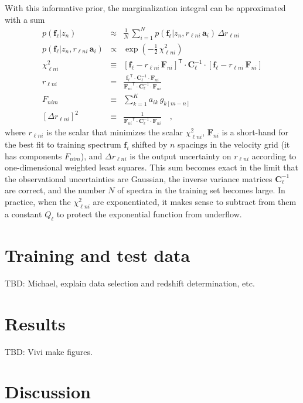 \documentclass[apj]{emulateapj}
\newcommand{\mmatrix}[1]{\boldsymbol{#1}}
\newcommand{\inverse}[1]{{#1}^{-1}}
\newcommand{\transpose}[1]{{#1}^{\mathsf{T}}}
\newcommand{\covar}{\mmatrix{C}}
\newcommand{\avec}{\mmatrix{a}}
\newcommand{\fvec}{\mmatrix{f}}
\newcommand{\Fvec}{\mmatrix{F}}
\newcommand{\invvar}{\inverse{\covar}}
\begin{document}
With this informative prior, the marginalization integral can be
approximated with a sum
\begin{eqnarray}\displaystyle
p(\fvec_\ell|z_n) &\approx& \frac{1}{N}\,\sum_{i=1}^N p(\fvec_\ell|z_n,r_{\ell ni}\,\avec_i)\,\Delta r_{\ell ni} \nonumber\\
p(\fvec_\ell|z_n,r_{\ell ni}\,\avec_i) &\propto& \exp(-\frac{1}{2}\,\chi^2_{\ell ni}) \nonumber\\
\chi^2_{\ell ni} &\equiv& \transpose{[\fvec_\ell - r_{\ell ni}\,\Fvec_{ni}]}\cdot\invvar_\ell\cdot[\fvec_\ell - r_{\ell ni}\,\Fvec_{ni}] \nonumber\\
r_{\ell ni} &=& \frac{\transpose{\fvec_\ell}\cdot\invvar_\ell\cdot\Fvec_{ni}}{\transpose{\Fvec_{ni}}\cdot\invvar_\ell\cdot\Fvec_{ni}} \nonumber\\
F_{nim} &\equiv& \sum_{k=1}^K a_{ik}\,g_{k[m-n]} \nonumber\\
{}[\Delta r_{\ell ni}]^2 &\equiv& \frac{1}{\transpose{\Fvec_{ni}}\cdot\invvar_\ell\cdot\Fvec_{ni}}
\quad ,
\end{eqnarray}
where $r_{\ell ni}$ is the scalar that minimizes the scalar
$\chi^2_{\ell ni}$, $\Fvec_{ni}$ is a short-hand for the best fit to
training spectrum $\fvec_i$ shifted by $n$ spacings in the velocity
grid (it has components $F_{nim}$), and $\Delta r_{\ell ni}$ is the
output uncertainty on $r_{\ell ni}$ according to one-dimensional
weighted least squares.  This sum becomes exact in the limit that the
observational uncertainties are Gaussian, the inverse variance
matrices $\invvar_\ell$ are correct, and the number $N$ of spectra in
the training set becomes large.  In practice, when the $\chi^2_{\ell n
  i}$ are exponentiated, it makes sense to subtract from them a
constant $Q_\ell$ to protect the exponential function from underflow.

\section{Training and test data}

TBD:  Michael, explain data selection and redshift determination, etc.

\section{Results}

TBD:  Vivi make figures.

\section{Discussion}
\end{document}
